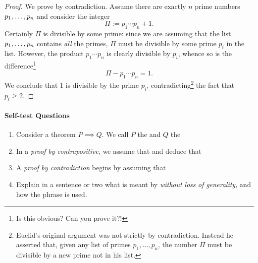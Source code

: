 \begin{proof}
We prove by contradiction. Assume there are exactly $n$ prime numbers ${p}_1,\ldots,{p}_{n}$ and consider the integer
\[\Pi:=p_1\cdots p_n+1.\]
Certainly $\Pi$ is divisible by some prime: since we are assuming that the list ${p}_1,\ldots,{p}_{n}$ contains \emph{all} the primes, $\Pi$ must be divisible by some prime $p_i$ in the list. However, the product $p_1\cdots p_n$ is clearly divisible by $p_i$, whence so is the difference\footnote{Is this obvious? Can you prove it?!}
\[\Pi-p_1\cdots p_n=1.\]
We conclude that 1 is divisible by the prime $p_i$, contradicting\footnote{Euclid's original argument was not strictly by contradiction. Instead he asserted that, given any list of primes $p_1,\ldots,p_n$, the number $\Pi$ must be divisible by a new prime not in his list.} the fact that $p_i\ge 2$.
\end{proof}

\paragraph{Self-test Questions}

\begin{enumerate}
  \item Consider a theorem $P\implies Q$. We call $P$ the \underline{\phantom{hypothesis}\qquad\qquad} and $Q$ the \underline{\phantom{conclusion}\qquad\qquad}
  \item In a \emph{proof by contrapositive,} we assume that \underline{\phantom{$Q$ is false}\qquad\qquad} and deduce that \underline{\phantom{$P$ is false}\qquad\qquad}
  \item A \emph{proof by contradiction} begins by assuming that \underline{\phantom{$P$ is true and $Q$ is false}\qquad\qquad}
  \item Explain in a sentence or two what is meant by \emph{without loss of generality,} and how the phrase is used.
\end{enumerate}

